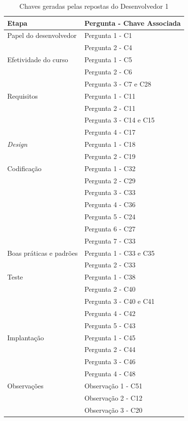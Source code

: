 \begin{table}[h]
	\centering
	\begin{tabular}{|m{4.8cm} | m{4.8cm} |}
		\hline
		\textbf{Etapa} & \textbf{Pergunta - Chave Associada} \\ \hline
		Papel do desenvolvedor & Pergunta 1 - C1 \\ \cline{2-2}
		& Pergunta 2 - C4 \\ \cline{2-2}
		\hline
		Efetividade do curso & Pergunta 1 - C5 \\ \cline{2-2}
		& Pergunta 2 - C6 \\ \cline{2-2}
		& Pergunta 3 - C7 e C28 \\ \cline{2-2}
		\hline
		Requisitos & Pergunta 1 - C11 \\ \cline{2-2}
		 & Pergunta 2 - C11 \\ \cline{2-2}
		& Pergunta 3 - C14 e C15 \\ \cline{2-2}
		& Pergunta 4 - C17 \\ \cline{2-2}
		 \hline
		\textit{Design} & Pergunta 1 - C18 \\ \cline{2-2}
		& Pergunta 2 - C19 \\ \cline{2-2}
		 \hline
		Codificação & Pergunta 1 - C32 \\ \cline{2-2}
		& Pergunta 2 - C29 \\ \cline{2-2}
		& Pergunta 3 - C33 \\ \cline{2-2}
		& Pergunta 4 - C36 \\ \cline{2-2}
		& Pergunta 5 - C24 \\ \cline{2-2}
		& Pergunta 6 - C27 \\ \cline{2-2}
		& Pergunta 7 - C33 \\ \cline{2-2} \hline
		Boas práticas e padrões & Pergunta 1 - C33 e C35 \\ \cline{2-2}
		& Pergunta 2 - C33 \\ \cline{2-2}
		\hline
		Teste & Pergunta 1 - C38 \\ \cline{2-2}
		& Pergunta 2 - C40 \\ \cline{2-2}
		& Pergunta 3 - C40 e C41 \\ \cline{2-2}
		& Pergunta 4 - C42 \\ \cline{2-2}
		& Pergunta 5 - C43 \\ \cline{2-2}
		\hline
		Implantação & Pergunta 1 - C45 \\ \cline{2-2}
		& Pergunta 2 - C44 \\ \cline{2-2}
		& Pergunta 3 - C46 \\ \cline{2-2}
		& Pergunta 4 - C48 \\ \cline{2-2}
		\hline
		Observações & Observação 1 - C51 \\ \cline{2-2} 
		& Observação 2 - C12 \\ \cline{2-2} 
		& Observação 3 - C20 \\
		\hline
	\end{tabular}

	\caption{Chaves geradas pelas repostas do Desenvolvedor 1}
	\label{tab03}
\end{table}

